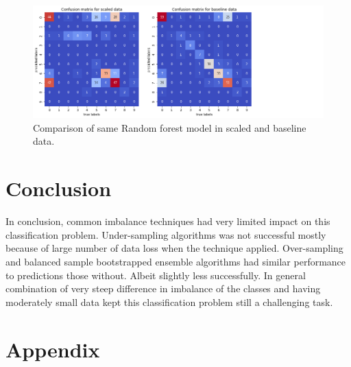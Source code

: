 \documentclass[12pt]{article}
\begin{document}
\begin{figure}[H] \label{fig:scalecomp}
    \centering
    \includegraphics[width=\textwidth]{img/confusioncompare.png}
    \caption{Comparison of same Random forest model in scaled and baseline data.}
\end{figure}

\section{Conclusion} \label{sec:conclution}

In conclusion, common imbalance techniques had very limited impact on this classification problem. Under-sampling algorithms was not successful mostly because of large number of data loss when the technique applied. Over-sampling and balanced sample bootstrapped ensemble algorithms had similar performance to predictions those without. Albeit slightly less successfully. In general combination of very steep difference in imbalance of the classes and having moderately small data kept this classification problem still a challenging task.

\printbibliography
{}

\section*{Appendix}
%
\end{document}
